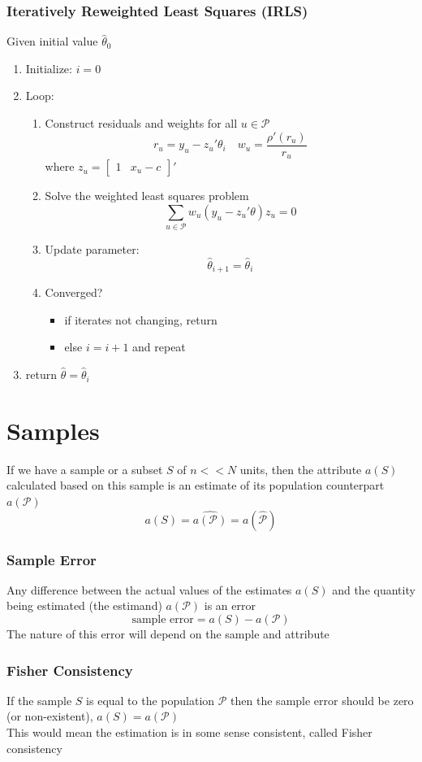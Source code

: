 \documentclass[11pt]{article}
\newcommand{\cv}[1]{\begin{bmatrix} #1 \end{bmatrix}}
\begin{document}
\subsubsection{Iteratively Reweighted Least Squares (IRLS)}
Given initial value $\hat{\theta}_0$
\begin{enumerate}
    \item Initialize: $i=0$
    \item Loop:
    \begin{enumerate}
        \item Construct residuals and weights for all $u\in\mathcal{P}$ \[r_u = y_u - z_u'\theta_i\quad w_u = \frac{\rho'(r_u)}{r_u} \] where $z_u = \cv{1 &x_u-c}'$
        \item Solve the weighted least squares problem \[\sum_{u\in\mathcal{P}}w_u(y_u-z_u'\theta)z_u = 0\]   
        \item Update parameter: \[\hat{\theta}_{i+1} = \hat{\theta}_i\]    
        \item Converged?
        \begin{itemize}
            \item if iterates not changing, return 
            \item else $i=i+1$ and repeat
        \end{itemize}
    \end{enumerate}
    \item return $\hat{\theta}=\hat{\theta}_i$
\end{enumerate}
\newpage 

\section{Samples}
If we have a sample or a subset $S$ of $n<<N$ units, then the attribute $a(S)$ calculated based 
on this sample is an estimate of its population counterpart $a(\mathcal{P})$
\[a(S) = \hat{a(\mathcal{P})} = a(\hat{\mathcal{P}})\]   
\subsubsection*{Sample Error}
Any difference between the actual values of the estimates $a(S)$ and the quantity being estimated (the estimand) $a(\mathcal{P})$ is an error 
\[\text{sample error} = a(S) - a(\mathcal{P})\]
The nature of this error will depend on the sample and attribute 
\subsubsection*{Fisher Consistency}
If the sample $S$ is equal to the population $\mathcal{P}$ then the sample error should be zero (or non-existent), $a(S) = a(\mathcal{P})$ \\
This would mean the estimation is in some sense consistent, called Fisher consistency
\end{document}
